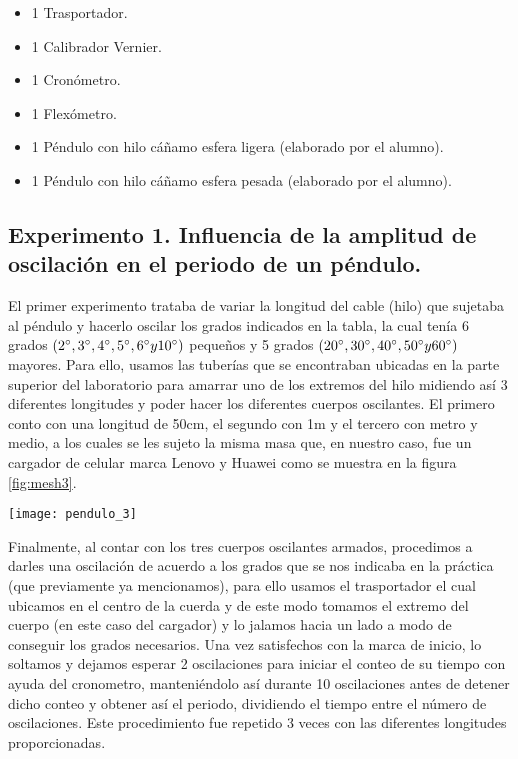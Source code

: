 \documentclass[11pt]{article}
\newenvironment{Figuras}
  {\par\medskip\noindent\minipage{\linewidth}}
  {\endminipage\par\medskip}
\begin{document}
\begin{multicols}{2}
\begin{itemize}
		\item 1 Trasportador.
		\item 1 Calibrador Vernier.
		\item 1 Cronómetro.
		\item 1 Flexómetro.
		\item 1 Péndulo con hilo cáñamo esfera ligera (elaborado por el alumno).
		\item 1 Péndulo con hilo cáñamo esfera pesada (elaborado por el alumno).

	\end{itemize}

	\subsection{Experimento 1. Influencia de la amplitud de oscilación en el periodo de un péndulo.}
	El primer experimento trataba de variar la longitud del cable (hilo) que sujetaba al péndulo y hacerlo oscilar los grados indicados en la tabla, la cual tenía 6 grados $(2\degree, 3\degree, 4\degree, 5\degree, 6\degree y 10\degree)$ pequeños y 5 grados $(20\degree, 30\degree, 40\degree, 50\degree y 60\degree)$ mayores.
Para ello, usamos las tuberías que se encontraban ubicadas en la parte superior del laboratorio para amarrar uno de los extremos del hilo midiendo así 3 diferentes longitudes y poder hacer los diferentes cuerpos oscilantes. El primero conto con una longitud de 50cm, el segundo con 1m y el tercero con metro y medio, a los cuales se les sujeto la misma masa que, en nuestro caso, fue un cargador de celular marca Lenovo y Huawei como se muestra en la figura \ref{fig:mesh3}.

\begin{Figuras}
	\centering
    \texttt{[image: pendulo\_3]}
    \label{fig:mesh3}
\end{Figuras}

Finalmente, al contar con los tres cuerpos oscilantes armados, procedimos a darles una oscilación de acuerdo a los grados que se nos indicaba en la práctica (que previamente ya mencionamos), para ello usamos el trasportador el cual ubicamos en el centro de la cuerda y de este modo tomamos el extremo del cuerpo (en este caso del cargador) y lo jalamos hacia un lado a modo de conseguir los grados necesarios. Una vez satisfechos con la marca de inicio, lo soltamos y dejamos esperar 2 oscilaciones para iniciar el conteo de su tiempo con ayuda del cronometro, manteniéndolo así durante 10 oscilaciones antes de detener dicho conteo y obtener así el periodo, dividiendo el tiempo entre el número de oscilaciones.
Este procedimiento fue repetido 3 veces con las diferentes longitudes proporcionadas.


\end{multicols}
\end{document}
